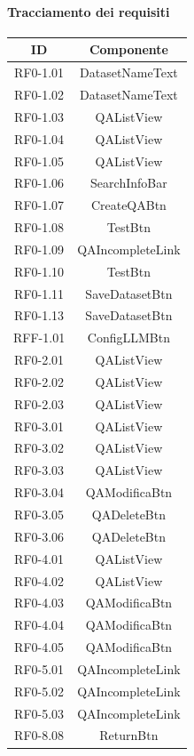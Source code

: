 \paragraph{Tracciamento dei requisiti}
\begin{tabularx}{\textwidth}{|c|c|}
    \hline
    \textbf{ID} & \textbf{Componente} \\
    \hline
        RF0-1.01 & DatasetNameText\\
    \hline
        RF0-1.02 & DatasetNameText\\
    \hline
        RF0-1.03 & QAListView\\
    \hline
        RF0-1.04 & QAListView\\
    \hline
        RF0-1.05 & QAListView\\
    \hline
        RF0-1.06 & SearchInfoBar\\
    \hline
        RF0-1.07 & CreateQABtn\\
    \hline
        RF0-1.08 & TestBtn\\
    \hline
        RF0-1.09 & QAIncompleteLink\\
    \hline
        RF0-1.10 & TestBtn\\
    \hline
        RF0-1.11 & SaveDatasetBtn\\
    \hline
        RF0-1.13 & SaveDatasetBtn\\
    \hline
        RFF-1.01 & ConfigLLMBtn\\ %
    \hline
        RF0-2.01 & QAListView\\
    \hline
        RF0-2.02 & QAListView\\
    \hline
        RF0-2.03 & QAListView\\
    \hline
        RF0-3.01 & QAListView\\
    \hline
        RF0-3.02 & QAListView\\
    \hline
        RF0-3.03 & QAListView\\
    \hline
        RF0-3.04 & QAModificaBtn\\
    \hline
        RF0-3.05 & QADeleteBtn\\
    \hline
        RF0-3.06 & QADeleteBtn\\
    \hline
        RF0-4.01 & QAListView\\
    \hline
        RF0-4.02 & QAListView\\
    \hline
        RF0-4.03 & QAModificaBtn\\
    \hline
        RF0-4.04 & QAModificaBtn\\
    \hline
        RF0-4.05 & QAModificaBtn\\
    \hline
        RF0-5.01 & QAIncompleteLink\\
    \hline
        RF0-5.02 & QAIncompleteLink\\
    \hline
        RF0-5.03 & QAIncompleteLink\\
    \hline
        RF0-8.08 & ReturnBtn\\
    \hline
\end{tabularx}